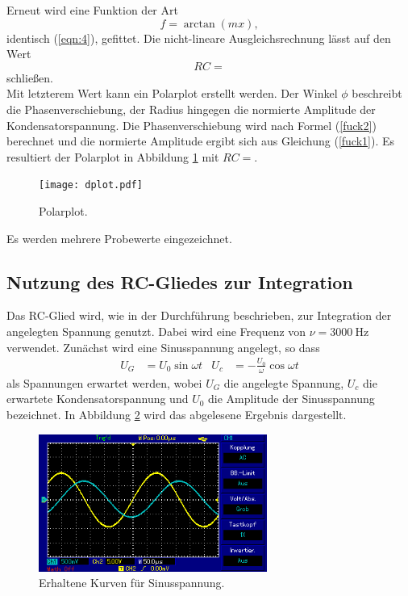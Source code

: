 Erneut wird eine Funktion der Art
\begin{equation}
  f = \arctan(mx),
\end{equation}
identisch (\ref{eqn:4}), gefittet.
Die nicht-lineare Ausgleichsrechnung lässt auf den Wert
\begin{equation}
  RC = 
\end{equation}
schließen.\\
Mit letzterem Wert kann ein Polarplot erstellt werden.
Der Winkel $\phi$ beschreibt die Phasenverschiebung, der Radius hingegen die normierte Amplitude der Kondensatorspannung.
Die Phasenverschiebung wird nach Formel (\ref{fuck2}) berechnet und die normierte Amplitude ergibt sich aus Gleichung (\ref{fuck1}).
Es resultiert der Polarplot in Abbildung \ref{abb:5} mit $RC = $.

\begin{figure}[H]
  \centering
  \texttt{[image: dplot.pdf]}
  \caption{Polarplot.}
  \label{abb:5}
\end{figure}

Es werden mehrere Probewerte eingezeichnet.

\subsection{Nutzung des RC-Gliedes zur Integration}
Das RC-Glied wird, wie in der Durchführung beschrieben, zur Integration der angelegten Spannung genutzt.
Dabei wird eine Frequenz von $\nu = \SI{3000}{\hertz}$ verwendet.
Zunächst wird eine Sinusspannung angelegt, so dass
\begin{align}
U_G &= U_0\sin{\omega t}  & U_c &= -\frac{U_0}{\omega}\cos{\omega t}
\end{align}
als Spannungen erwartet werden, wobei $U_G$ die angelegte Spannung, $U_c$ die erwartete Kondensatorspannung und $U_0$ die Amplitude der Sinusspannung bezeichnet.
In Abbildung \ref{fig:sin_r} wird das abgelesene Ergebnis dargestellt.

\begin{figure}[H]
  \centering
  \includegraphics[height=4.5cm]{oz5.png}
  \caption{Erhaltene Kurven für Sinusspannung.}
  \label{fig:sin_r}
\end{figure}


